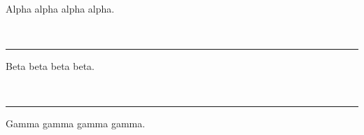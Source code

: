 \documentclass[11pt]{article}
\newcommand{\cvsection}[1]{\vspace{6pt}{\large\bfseries #1}\\\rule{\textwidth}{0.6pt}\vspace{2pt}}
\begin{document}
Alpha alpha alpha alpha.

\cvsection{Education}

Beta beta beta beta.

\cvsection{Experience}

Gamma gamma gamma gamma.
\end{document}
